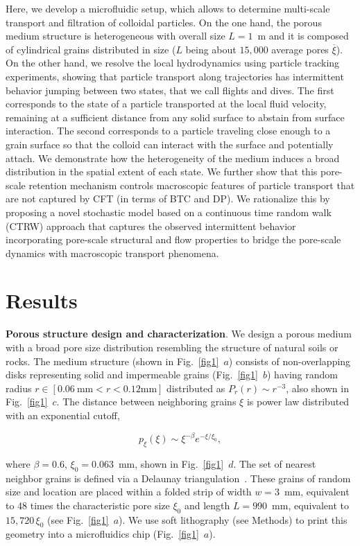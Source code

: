 \documentclass[singlecolumn,pre,notitlepage,preprintnumbers,floatfix,superscriptaddress]{revtex4-1}
\begin{document}
 \noindent
Here, we develop a microfluidic setup, which allows to determine multi-scale transport and filtration of colloidal particles. On the one hand, the porous medium structure is heterogeneous with overall size $L = 1$~m and it is composed of cylindrical grains distributed in size ($L$ being about $15,000$ average pores $\overline{\xi}$). On the other hand, we resolve the local hydrodynamics using particle tracking experiments, showing that particle transport along trajectories has intermittent behavior jumping between two states, that we call flights and dives. The first corresponds to the state of a particle transported at the local fluid velocity, remaining at a sufficient distance from any solid surface to abstain from surface interaction. The second corresponds to a particle traveling close enough to a grain surface so that the colloid can interact with the surface and potentially attach. We demonstrate how the heterogeneity of the medium induces a broad distribution in the spatial extent of each state. We further show that this pore-scale retention mechanism controls macroscopic features of particle transport that are not captured by CFT (in terms of BTC and DP). We rationalize this by proposing a novel stochastic model based on a continuous time random walk (CTRW) approach that captures the observed intermittent behavior incorporating pore-scale structural and flow properties to bridge the pore-scale dynamics with macroscopic transport phenomena.

\section*{Results}

\noindent
\textbf{Porous structure design and characterization}.
We design a porous medium with a broad pore size distribution resembling the structure of natural soils or rocks. The medium structure (shown in Fig.~\ref{fig1}~$a$) consists of non-overlapping disks representing solid and impermeable grains (Fig.~\ref{fig1}~$b$) having random radius $r \in [0.06~\textrm{mm} < r < 0.12 \textrm{mm}]$ distributed as $P_r(r) \sim r^{-3}$, also shown in Fig.~\ref{fig1}~$c$. The distance between neighboring grains $\xi$ is power law distributed with an exponential cutoff,

\begin{equation}\label{xiPDF}
 	p_\xi(\xi) \sim \xi^{-\beta} e^{-\xi / \xi_0},
\end{equation}

where $\beta = 0.6$, $\xi_0 = 0.063$~mm, shown in Fig.~\ref{fig1}~$d$. The set of nearest neighbor grains is defined via a Delaunay triangulation~\cite{deAnnaPRF2017}. These grains of random size and location are placed within a folded strip of width $w = 3$~mm, equivalent to 48 times the characteristic pore size $\xi_0$ and length $L = 990$~mm, equivalent to $15,720 \, \xi_0$ (see Fig.~\ref{fig1}~$a$). We use soft lithography (see Methods) to print this geometry into a microfluidics chip (Fig.~\ref{fig1}~$a$).
\end{document}
